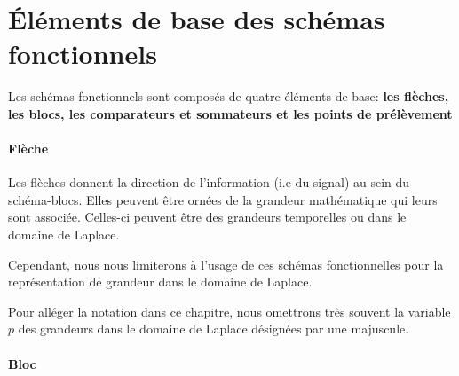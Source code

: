 \section{\'Eléments de base des schémas fonctionnels}
Les schémas fonctionnels sont composés de quatre éléments de base:
\textbf{les flèches, les blocs, les comparateurs et sommateurs et les points 
de prélèvement}

\paragraph{Flèche}
Les flèches donnent la direction de l'information (i.e du signal) au sein du 
schéma-blocs. Elles peuvent être ornées de la grandeur mathématique qui leurs 
sont associée. 
Celles-ci peuvent être des grandeurs temporelles ou dans le domaine de Laplace. 
\begin{center}

\end{center}
Cependant, nous nous limiterons à l'usage de ces schémas fonctionnelles pour la 
représentation de grandeur dans le domaine de Laplace.

Pour alléger la notation dans ce chapitre, nous omettrons 
très souvent la variable $p$ des grandeurs dans le domaine de Laplace désignées 
par une majuscule.

\newpage
\paragraph{Bloc}

